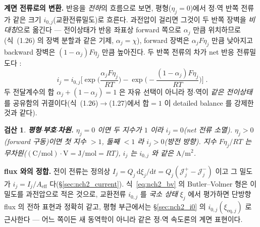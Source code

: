 \documentclass[11pt,a4paper]{article}
\newtheorem*{verifybox}{검산}
\newcommand{\dd}{\mathrm{d}}
\newcommand{\eff}{\mathrm{eff}}
\newcommand{\eq}{\mathrm{eq}}
\begin{document}
\textbf{계면 전류로의 변환.} 반응을 \emph{전하}의 흐름으로 보면, 평형($\eta_j=0$)에서 정$\cdot$역 반쪽 전류가 같은
크기 $i_{0,j}$(교환전류밀도)로 흐른다. 과전압이 걸리면 그것이 두 반쪽 장벽을 \emph{비대칭}으로 옮긴다 — 전이상태가
반응 좌표상 forward 쪽으로 $\alpha_j$ 만큼 위치하므로(식~(1.26) 의 장벽 분할과 같은 기제, $\alpha_j=\chi$), forward
장벽은 $\alpha_jF\eta_j$ 만큼 낮아지고 backward 장벽은 $(1-\alpha_j)F\eta_j$ 만큼 높아진다. 두 반쪽 전류의 차가
net 반응 전류밀도다 \cite{bardfaulkner,newman2004}:
\begin{equation}
\boxed{\;i_j=i_{0,j}\Big[\exp\!\Big(\frac{\alpha_jF\eta_j}{RT}\Big)-\exp\!\Big(-\frac{(1-\alpha_j)F\eta_j}{RT}\Big)\Big]\;.}
\label{eq:nch2_bv}
\end{equation}
두 전달계수의 합 $\alpha_j+(1-\alpha_j)=1$ 은 자유 선택이 아니라 정$\cdot$역이 \emph{같은 전이상태}를 공유함의
귀결이다(식~(1.26)$\to$(1.27)에서 합$=1$ 이 detailed balance 를 강제한 것과 같다).
\begin{verifybox}
\textbf{평형$\cdot$부호$\cdot$차원.} $\eta_j=0$ 이면 두 지수가 $1$ 이라 $i_j=0$(net 전류 소멸). $\eta_j>0$(forward
구동)이면 첫 지수 $>1$, 둘째 $<1$ 라 $i_j>0$(방전 방향). 지수 $F\eta_j/RT$ 는 무차원($\mathrm{(C/mol)\cdot V}
=\mathrm{J/mol}=RT$), $i_j$ 는 $i_{0,j}$ 와 같은 $\mathrm{A/m^2}$.
\end{verifybox}
\textbf{flux 와의 정합.} 전이 전류는 정의상 $I_j=Q_j\,\dd\xi_j/\dd t=Q_j(\mathcal J_j^+-\mathcal J_j^-)$ 이고 그
밀도가 $i_j=I_j/A_\eff$ 다(\S\ref{sec:nch2_current}). 식~\eqref{eq:nch2_bv} 의 Butler--Volmer 형은 이 밀도를
과전압으로 적은 것으로, 교환전류 $i_{0,j}$ 를 \emph{국소 상태} $\xi_j$ 에서 평가하면 단방향 flux 의 전하 표현과
정확히 같고, 평형 부근에서는 \S\ref{sec:nch2_i0} 의 $i_{0,j}(\xi_{\eq,j})$ 로 근사한다 — 어느 쪽이든 새 동역학이
아니라 같은 정$\cdot$역 속도론의 계면 표현이다.

\end{document}
